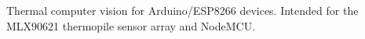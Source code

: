 Thermal computer vision for Arduino/\+E\+S\+P8266 devices. Intended for the M\+L\+X90621 thermopile sensor array and Node\+M\+CU. 